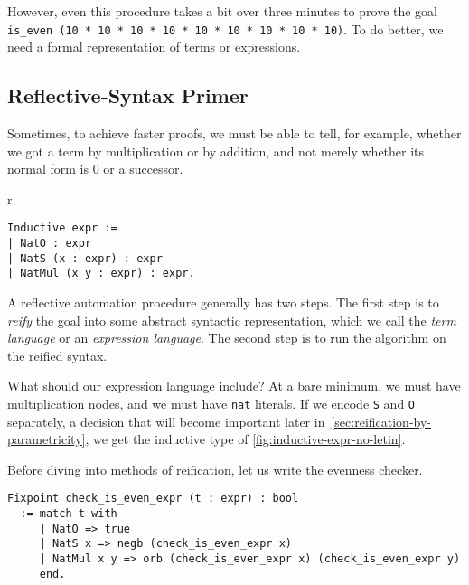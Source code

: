 However, even this procedure takes a bit over three minutes to prove the goal \texttt{is_even (10 * 10 * 10 * 10 * 10 * 10 * 10 * 10 * 10)}.
To do better, we need a formal representation of terms or expressions.

\subsection{Reflective-Syntax Primer}
Sometimes, to achieve faster proofs, we must be able to tell, for example, whether we got a term by multiplication or by addition, and not merely whether its normal form is 0 or a successor.%

\begin{wrapfigure}[4]{r}{}
\begin{verbatim}
Inductive expr :=
| NatO : expr
| NatS (x : expr) : expr
| NatMul (x y : expr) : expr.
\end{verbatim}
\caption{Simple Expressions}\label{fig:inductive-expr-no-letin}
\end{wrapfigure}

A reflective automation procedure generally has two steps.
The first step is to \emph{reify} the goal into some abstract syntactic representation, which we call the \emph{term language} or an \emph{expression language}.
The second step is to run the algorithm on the reified syntax.

What should our expression language include?
At a bare minimum, we must have multiplication nodes, and we must have \texttt{nat} literals.
If we encode \texttt{S} and \texttt{O} separately, a decision that will become important later in~\autoref{sec:reification-by-parametricity}, we get the inductive type of \autoref{fig:inductive-expr-no-letin}.

Before diving into methods of reification, let us write the evenness checker.
\begin{verbatim}
Fixpoint check_is_even_expr (t : expr) : bool
  := match t with
     | NatO => true
     | NatS x => negb (check_is_even_expr x)
     | NatMul x y => orb (check_is_even_expr x) (check_is_even_expr y)
     end.
\end{verbatim}

